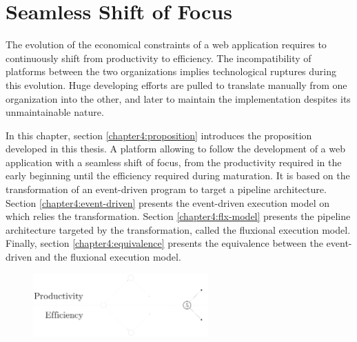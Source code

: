 \chapter{Seamless Shift of Focus} \label{chapter4}
\minitoc
\eject

The evolution of the economical constraints of a web application requires to continuously shift from productivity to efficiency.
The incompatibility of platforms between the two organizations implies technological ruptures during this evolution.
Huge developing efforts are pulled to translate manually from one organization into the other, and later to maintain the implementation despites its unmaintainable nature.

In this chapter, section \ref{chapter4:proposition} introduces the proposition developed in this thesis.
A platform allowing to follow the development of a web application with a seamless shift of focus, from the productivity required in the early beginning until the efficiency required during maturation.
It is based on the transformation of an event-driven program to target a pipeline architecture.
Section \ref{chapter4:event-driven} presents the event-driven execution model on which relies the transformation.
Section \ref{chapter4:flx-model} presents the pipeline architecture targeted by the transformation, called the fluxional execution model.
Finally, section \ref{chapter4:equivalence} presents the equivalence between the event-driven and the fluxional execution model.

\begin{figure}[h!] \label{fig:state-of-the-art-proposition}
\begin{center}
\includegraphics[width=0.6\textwidth]{../resources/state-of-the-art-5.pdf}
\end{center}
\end{figure}




